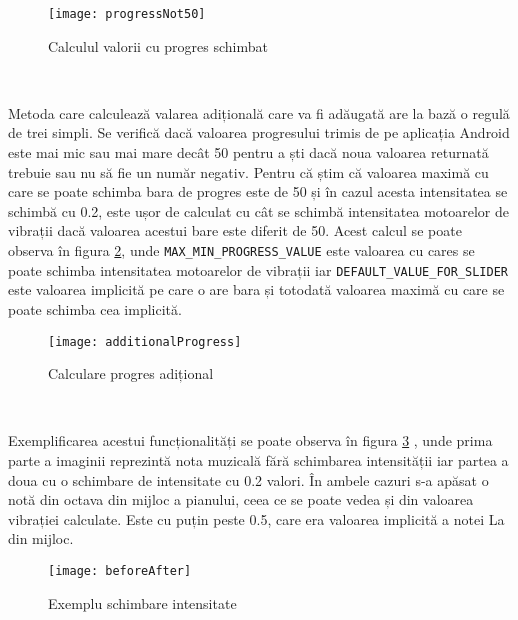 \documentclass[../IoMusT.tex]{subfiles}
\begin{document}
\begin{figure}[h]
\centering
\texttt{[image: progressNot50]}
\caption{Calculul valorii cu progres schimbat}
\label{fig:not50}
\end{figure} 
\\
\par Metoda care calculează valarea adițională care va fi adăugată are la bază o regulă de trei simpli. Se verifică dacă valoarea progresului trimis de pe aplicația Android este mai mic sau mai mare decât 50 pentru a ști dacă noua valoarea returnată trebuie sau nu să fie un număr negativ. Pentru că știm că valoarea maximă cu care se poate schimba bara de progres este de 50 și în cazul acesta intensitatea se schimbă cu 0.2, este ușor de calculat cu cât se schimbă intensitatea motoarelor de vibrații dacă valoarea acestui bare este diferit de 50.
Acest calcul se poate observa în figura \ref{fig:additionalProgress}, unde \verb|MAX_MIN_PROGRESS_VALUE| este valoarea cu cares se poate schimba intensitatea motoarelor de vibrații iar \verb|DEFAULT_VALUE_FOR_SLIDER| este valoarea implicită pe care o are bara și totodată valoarea maximă cu care se poate schimba cea implicită.
\begin{figure}[h]
\centering
\texttt{[image: additionalProgress]}
\caption{Calculare progres adițional}
\label{fig:additionalProgress}
\end{figure} 
\\
\par Exemplificarea acestui funcționalități se poate observa în figura \ref{fig:beforeAfter} , unde prima parte a imaginii reprezintă nota muzicală fără schimbarea intensității iar partea a doua cu o schimbare de intensitate cu 0.2 valori. În ambele cazuri s-a apăsat o notă din octava din mijloc a pianului, ceea ce se poate vedea și din valoarea vibrației calculate. Este cu puțin peste 0.5, care era valoarea implicită a notei La din mijloc.
\begin{figure}[h]
\centering
\texttt{[image: beforeAfter]}
\caption{Exemplu schimbare intensitate}
\label{fig:beforeAfter}
\end{figure} 
\end{document}
